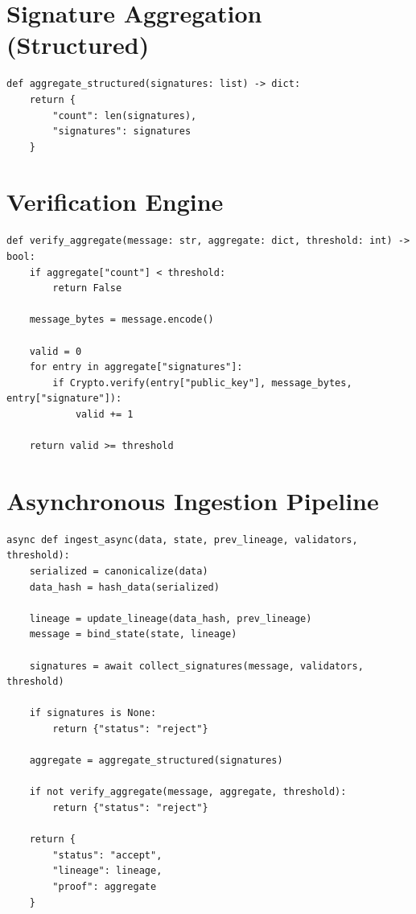 \section{Signature Aggregation (Structured)}

\begin{verbatim}
def aggregate_structured(signatures: list) -> dict:
    return {
        "count": len(signatures),
        "signatures": signatures
    }
\end{verbatim}

\section{Verification Engine}

\begin{verbatim}
def verify_aggregate(message: str, aggregate: dict, threshold: int) -> bool:
    if aggregate["count"] < threshold:
        return False

    message_bytes = message.encode()

    valid = 0
    for entry in aggregate["signatures"]:
        if Crypto.verify(entry["public_key"], message_bytes, entry["signature"]):
            valid += 1

    return valid >= threshold
\end{verbatim}

\section{Asynchronous Ingestion Pipeline}

\begin{verbatim}
async def ingest_async(data, state, prev_lineage, validators, threshold):
    serialized = canonicalize(data)
    data_hash = hash_data(serialized)

    lineage = update_lineage(data_hash, prev_lineage)
    message = bind_state(state, lineage)

    signatures = await collect_signatures(message, validators, threshold)

    if signatures is None:
        return {"status": "reject"}

    aggregate = aggregate_structured(signatures)

    if not verify_aggregate(message, aggregate, threshold):
        return {"status": "reject"}

    return {
        "status": "accept",
        "lineage": lineage,
        "proof": aggregate
    }
\end{verbatim}

